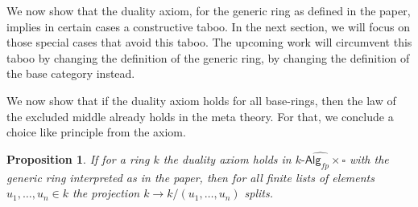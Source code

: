 \documentclass[10pt,a4paper]{article}
\newtheorem{proposition}{Proposition}[section]
\newcommand{\Alg}{\mathsf{Alg}}
\begin{document}
We now show that the duality axiom, for the generic ring as defined in the paper, implies in certain cases a constructive taboo.
In the next section, we will focus on those special cases that avoid this taboo.
The upcoming work will circumvent this taboo by changing the definition of the generic ring, by changing the definition of the base category instead.

We now show that if the duality axiom holds for all base-rings, then the law of the excluded middle already holds in the meta theory.
For that, we conclude a choice like principle from the axiom.

\begin{proposition}\label{prop:strict-duality-implies-lem}
  If for a ring $k$ the duality axiom holds in $\widehat{k\text{-}\Alg_{fp} \times \square}$ with the generic ring interpreted as in the paper, then for all finite lists of elements $u_1, \ldots, u_n \in k$ the projection $k \to k /(u_1, \ldots, u_n)$ splits.
\end{proposition}
\end{document}
